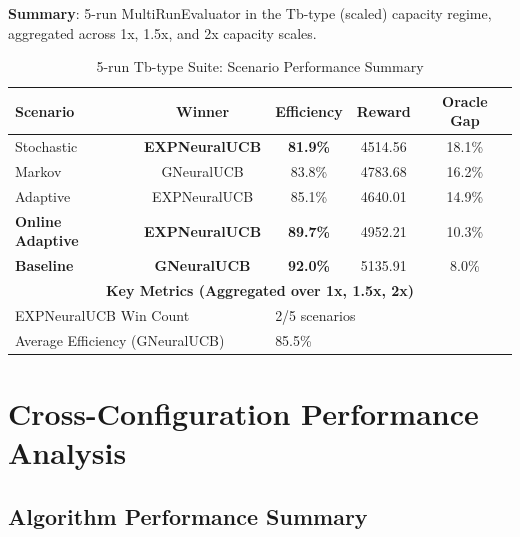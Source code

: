 \documentclass[11pt,a4paper]{article}
\newcommand{\stochastic}[1]{\textcolor{stochasticcolor}{\textbf{#1}}}
\newcommand{\success}[1]{\textcolor{successcolor}{\textbf{#1}}}
\begin{document}
\begin{tcolorbox}[colback=criticalcolor!10,colframe=criticalcolor]

\textbf{Summary}: 5-run MultiRunEvaluator in the Tb-type (scaled) capacity regime, aggregated across 1x, 1.5x, and 2x capacity scales.

\begin{table}[H]
\centering
\caption{5-run Tb-type Suite: Scenario Performance Summary}
\begin{tabular}{|l|c|c|c|c|}
\hline
\textbf{Scenario} & \textbf{Winner} & \textbf{Efficiency} & \textbf{Reward} & \textbf{Oracle Gap} \\
\hline
\hline
Stochastic      & \stochastic{EXPNeuralUCB} & \stochastic{81.9\%} & 4514.56 & 18.1\% \\
Markov          & GNeuralUCB                & 83.8\%              & 4783.68 & 16.2\% \\
Adaptive        & EXPNeuralUCB              & 85.1\%              & 4640.01 & 14.9\% \\
\success{Online Adaptive} & \success{EXPNeuralUCB} & \success{89.7\%} & 4952.21 & 10.3\% \\
\success{Baseline}        & \success{GNeuralUCB}   & \success{92.0\%} & 5135.91 & 8.0\% \\
\hline
\multicolumn{5}{|c|}{\textbf{Key Metrics (Aggregated over 1x, 1.5x, 2x)}} \\
\hline
\multicolumn{2}{|l|}{EXPNeuralUCB Win Count} & \multicolumn{3}{|l|}{2/5 scenarios} \\
\multicolumn{2}{|l|}{Average Efficiency (GNeuralUCB)} & \multicolumn{3}{|l|}{85.5\%} \\
\hline
\end{tabular}
\end{table}

\end{tcolorbox}

\section{Cross-Configuration Performance Analysis}

\subsection{Algorithm Performance Summary}
\end{document}
